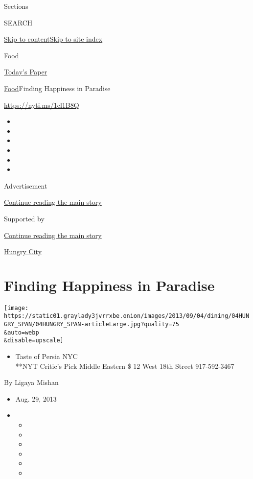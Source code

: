 Sections

SEARCH

\protect\hyperlink{site-content}{Skip to
content}\protect\hyperlink{site-index}{Skip to site index}

\href{https://www.nytimes3xbfgragh.onion/section/food}{Food}

\href{https://myaccount.nytimes3xbfgragh.onion/auth/login?response_type=cookie\&client_id=vi}{}

\href{https://www.nytimes3xbfgragh.onion/section/todayspaper}{Today's
Paper}

\href{/section/food}{Food}\textbar{}Finding Happiness in Paradise

\url{https://nyti.ms/1cl1B8Q}

\begin{itemize}
\item
\item
\item
\item
\item
\item
\end{itemize}

Advertisement

\protect\hyperlink{after-top}{Continue reading the main story}

Supported by

\protect\hyperlink{after-sponsor}{Continue reading the main story}

\href{/column/hungry-city}{Hungry City}

\hypertarget{finding-happiness-in-paradise}{%
\section{Finding Happiness in
Paradise}\label{finding-happiness-in-paradise}}

\texttt{[image: https://static01.graylady3jvrrxbe.onion/images/2013/09/04/dining/04HUNGRY\_SPAN/04HUNGRY\_SPAN-articleLarge.jpg?quality=75\\\&auto=webp\\\&disable=upscale]}

\begin{itemize}
\tightlist
\item
  Taste of Persia NYC\\
  **NYT Critic's Pick Middle Eastern \$ 12 West 18th Street 917-592-3467
\end{itemize}

By Ligaya Mishan

\begin{itemize}
\item
  Aug. 29, 2013
\item
  \begin{itemize}
  \item
  \item
  \item
  \item
  \item
  \item
  \end{itemize}
\end{itemize}

